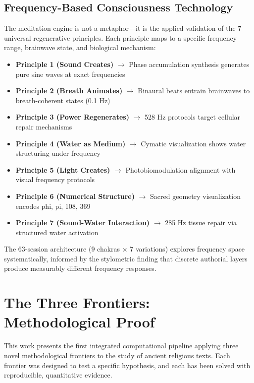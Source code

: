 \documentclass[11pt]{article}
\begin{document}
\subsection{Frequency-Based Consciousness Technology}

The meditation engine is not a metaphor---it is the applied validation of the 7 universal regenerative principles. Each principle maps to a specific frequency range, brainwave state, and biological mechanism:

\begin{itemize}
    \item \textbf{Principle 1 (Sound Creates)} $\rightarrow$ Phase accumulation synthesis generates pure sine waves at exact frequencies
    \item \textbf{Principle 2 (Breath Animates)} $\rightarrow$ Binaural beats entrain brainwaves to breath-coherent states (0.1 Hz)
    \item \textbf{Principle 3 (Power Regenerates)} $\rightarrow$ 528 Hz protocols target cellular repair mechanisms
    \item \textbf{Principle 4 (Water as Medium)} $\rightarrow$ Cymatic visualization shows water structuring under frequency
    \item \textbf{Principle 5 (Light Creates)} $\rightarrow$ Photobiomodulation alignment with visual frequency protocols
    \item \textbf{Principle 6 (Numerical Structure)} $\rightarrow$ Sacred geometry visualization encodes phi, pi, 108, 369
    \item \textbf{Principle 7 (Sound-Water Interaction)} $\rightarrow$ 285 Hz tissue repair via structured water activation
\end{itemize}

The 63-session architecture (9 chakras $\times$ 7 variations) explores frequency space systematically, informed by the stylometric finding that discrete authorial layers produce measurably different frequency responses.

\section{The Three Frontiers: Methodological Proof}

This work presents the first integrated computational pipeline applying three novel methodological frontiers to the study of ancient religious texts. Each frontier was designed to test a specific hypothesis, and each has been solved with reproducible, quantitative evidence.
\end{document}
